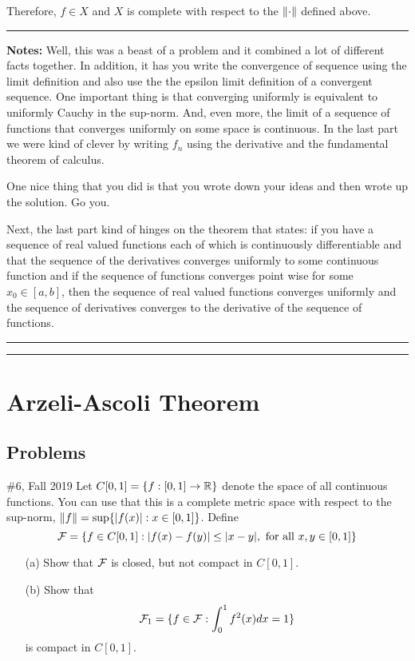 \documentclass{article}
\begin{document}
Therefore, $f\in X$ and $X$ is complete with respect to the $\left\lVert {\cdot} \right\rVert$ defined above.\\

\hrule

\textbf{Notes:} Well, this was a beast of a problem and it combined a lot of different facts together. In addition, it has you write the convergence of sequence using the limit definition and also use the the epsilon limit definition of a convergent sequence. One important thing is that converging uniformly is equivalent to uniformly Cauchy in the sup-norm. And, even more, the limit of a sequence of functions that converges uniformly on some space is continuous. In the last part we were kind of clever by writing $f_n$ using the derivative and the fundamental theorem of calculus. 

One nice thing that you did is that you wrote down your ideas and then wrote up the solution. Go you.

Next, the last part kind of hinges on the theorem that states: if you have a sequence of real valued functions each of which is continuously differentiable and that the sequence of the derivatives converges uniformly to some continuous function and if the sequence of functions converges point wise for some $x_0\in [a,b]$, then the sequence of real valued functions converges uniformly and the sequence of derivatives converges to the derivative of the sequence of functions.\\

\hrule\vspace{2pt}
\hrule

\break

\section{Arzeli-Ascoli Theorem}

\subsection{Problems}

\begin{problem}{\#6, Fall 2019} Let $C[0,1] = \{f: [0,1]\to\mathbb R\}$ denote the space of all continuous functions. You can use that this is a complete metric space with respect to the sup-norm, $\left\lVert {f} \right\rVert = \sup\{|f(x)|: x\in[0,1]\}$. Define
	\[ \mathcal F = \{ f\in C[0,1] : |f(x) - f(y)| \leq |x-y|, \text{ for all } x,y\in[0,1]\}\]
\begin{enumerate}
	\item[(a)] Show that $\mathcal F$ is closed, but not compact in $C[0,1]$.
	\item[(b)] Show that 
		\[ \mathcal F_1 = \{ f\in \mathcal F : \int_0^1 f^2(x) dx = 1\} \]
	is compact in $C[0,1]$.
\end{enumerate}
\end{problem}
\end{document}
